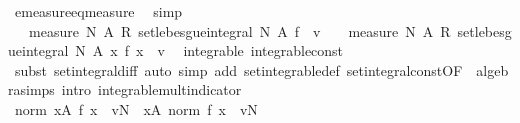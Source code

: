 \begin{isabellebody}
\ emeasure{\isacharunderscore}{\kern0pt}eq{\isacharunderscore}{\kern0pt}measure\ \isamarkupfalse%
\ simp\isanewline
\ \ \ \ \ \ \ \ \isamarkupfalse%
\ {\isachardoublequoteopen}{\isacharparenleft}{\kern0pt}{}\ {\isacharslash}{\kern0pt}\ measure\ N\ A{\isacharparenright}{\kern0pt}\ {\isacharasterisk}{\kern0pt}\isactrlsub R\ set{\isacharunderscore}{\kern0pt}lebesgue{\isacharunderscore}{\kern0pt}integral\ N\ A\ f\ {\isacharminus}{\kern0pt}\ v\ {\isacharequal}{\kern0pt}\ {\isacharparenleft}{\kern0pt}{}\ {\isacharslash}{\kern0pt}\ measure\ N\ A{\isacharparenright}{\kern0pt}\ {\isacharasterisk}{\kern0pt}\isactrlsub R\ set{\isacharunderscore}{\kern0pt}lebesgue{\isacharunderscore}{\kern0pt}integral\ N\ A\ {\isacharparenleft}{\kern0pt}{\isasymlambda}x{\isachardot}{\kern0pt}\ f\ x\ {\isacharminus}{\kern0pt}\ v{\isacharparenright}{\kern0pt}{\isachardoublequoteclose}\ \isamarkupfalse%
\ integrable\ integrable{\isacharunderscore}{\kern0pt}const\ {\isacharasterisk}{\kern0pt}\ \isamarkupfalse%
\ {\isacharparenleft}{\kern0pt}subst\ set{\isacharunderscore}{\kern0pt}integral{\isacharunderscore}{\kern0pt}diff{\isacharparenleft}{\kern0pt}{}{\isacharparenright}{\kern0pt}{\isacharcomma}{\kern0pt}\ auto\ simp\ add{\isacharcolon}{\kern0pt}\ set{\isacharunderscore}{\kern0pt}integrable{\isacharunderscore}{\kern0pt}def\ set{\isacharunderscore}{\kern0pt}integral{\isacharunderscore}{\kern0pt}const{\isacharbrackleft}{\kern0pt}OF\ {\isacharasterisk}{\kern0pt}{\isacharbrackright}{\kern0pt}\ algebra{\isacharunderscore}{\kern0pt}simps\ intro{\isacharbang}{\kern0pt}{\isacharcolon}{\kern0pt}\ integrable{\isacharunderscore}{\kern0pt}mult{\isacharunderscore}{\kern0pt}indicator{\isacharparenright}{\kern0pt}\isanewline
\ \ \ \ \ \ \ \ \isamarkupfalse%
\ \isamarkupfalse%
\ {\isachardoublequoteopen}norm\ {\isacharparenleft}{\kern0pt}{\isasymintegral}x{\isasymin}A{\isachardot}{\kern0pt}\ {\isacharparenleft}{\kern0pt}f\ x\ {\isacharminus}{\kern0pt}\ v{\isacharparenright}{\kern0pt}{\isasympartial}N{\isacharparenright}{\kern0pt}\ {\isasymle}\ {\isacharparenleft}{\kern0pt}{\isasymintegral}x{\isasymin}A{\isachardot}{\kern0pt}\ norm\ {\isacharparenleft}{\kern0pt}f\ x\ {\isacharminus}{\kern0pt}\ v{\isacharparenright}{\kern0pt}{\isasympartial}N{\isacharparenright}{\kern0pt}{\isachardoublequoteclose}\ \isamarkupfalse%
\ {\isacharasterisk}{\kern0pt}\ \isamarkupfalse%

\end{isabellebody}
